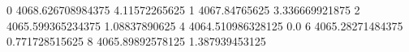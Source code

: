 0 4068.626708984375 4.11572265625
1 4067.84765625 3.336669921875
2 4065.599365234375 1.08837890625
4 4064.510986328125 0.0
6 4065.28271484375 0.771728515625
8 4065.89892578125 1.387939453125
